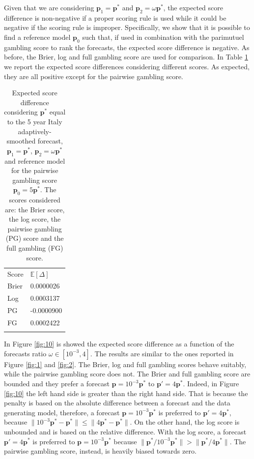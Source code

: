 \documentclass[referee,sn-basic]{sn-jnl}
\theoremstyle{thmstyleone}%
\theoremstyle{thmstyletwo}%
\theoremstyle{thmstylethree}%
\begin{document}
Given that we are considering $\mathbf p_1 = \mathbf p^*$ and $\mathbf p_2 = \omega \mathbf p^*$, the expected score difference is non-negative if a proper scoring rule is used while it could be negative if the scoring rule is improper. Specifically, we show that it is possible to find a reference model $\mathbf p_0$ such that, if used in combination with the parimutuel gambling score to rank the forecasts, the expected score difference is negative. As before, the Brier, log and full gambling score are used for comparison. In Table \ref{tab:3} we report the expected score differences considering different scores. As expected, they are all positive except for the pairwise gambling score.

\begin{table}
\caption{Expected score difference considering $\mathbf p^*$ equal to the 5 year Italy adaptively-smoothed forecast, $\mathbf p_1 = \mathbf p^*$, $\mathbf p_2 = \omega \mathbf p^*$ and reference model for the pairwise gambling score $\mathbf p_0 = 5\mathbf p^*$. The scores considered are: the Brier score, the log score, the pairwise gambling (PG) score and the full gambling (FG) score.}
\label{tab:3}       
\begin{tabular}{l |   l}
\hline\noalign{\smallskip}
Score & $\mathbb E[\Delta]$  \\
\noalign{\smallskip}\hline\noalign{\smallskip}
Brier & 0.0000026\\
Log &  0.0003137\\
PG &  -0.0000900\\
FG &  0.0002422\\
\noalign{\smallskip}\hline
\end{tabular}
\end{table}

In Figure \ref{fig:10} is showed the expected score difference as a function of the forecasts ratio $\omega \in [10^{-3}, 4]$. The results are similar to the ones reported in Figure \ref{fig:1} and \ref{fig:2}. The Brier, log and full gambling scores behave suitably, while the pairwise gambling score does not. The Brier and full gambling score are bounded and they prefer a forecast $\mathbf p = 10^{-3}\mathbf p^*$ to $\mathbf p' = 4\mathbf p^*$. Indeed, in Figure \ref{fig:10} the left hand side is greater than the right hand side. That is because the penalty is based on the absolute difference between a forecast and the data generating model, therefore, a forecast $\mathbf p = 10^{-3}\mathbf p^*$ is preferred to $\mathbf p' = 4 \mathbf p^*$, because $\lVert 10^{-3}\mathbf p^* - \mathbf p^* \rVert \leq  \lVert 4\mathbf p^* - \mathbf p^* \rVert$. On the other hand, the log score is unbounded and is based on the relative difference. With the log score, a forecast $\mathbf p' = 4\mathbf p^*$ is preferred to $\mathbf p = 10^{-3}\mathbf p^*$ because $\lVert \mathbf p^*/ 10^{-3}\mathbf p^* \rVert > \lVert \mathbf p^*/ 4\mathbf p^*\rVert$. The pairwise gambling score, instead, is heavily biased towards zero.  
\end{document}
